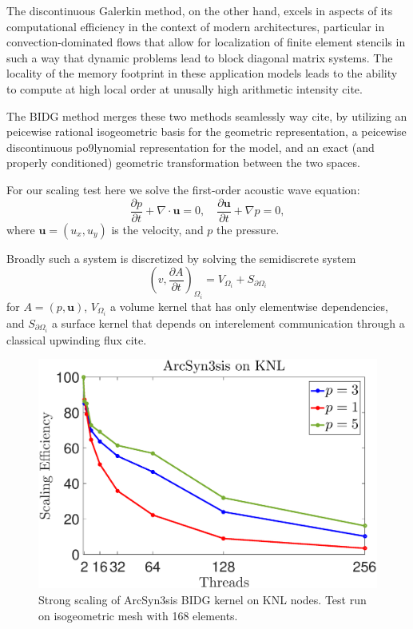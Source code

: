The discontinuous Galerkin method, on the other hand, excels in aspects of its computational efficiency in the context of modern architectures, particular in convection-dominated flows that allow for localization of finite element stencils in such a way that dynamic problems lead to block diagonal matrix systems.  The locality of the memory footprint in these application models leads to the ability to compute at high local order at unusally high arithmetic intensity cite.

The BIDG method merges these two methods seamlessly way cite, by utilizing an peicewise rational isogeometric basis for the geometric representation, a peicewise discontinuous po9lynomial representation for the model, and an exact (and properly conditioned) geometric transformation between the two spaces.

For our scaling test here we solve the first-order acoustic wave equation: \begin{equation} \label{awe} \frac{\partial p}{\partial t} + \nabla\cdot \boldsymbol{u} = 0, \quad  \frac{\partial\boldsymbol{u}}{\partial t} + \nabla p = 0, \end{equation} where $\boldsymbol{u}=(u_x,u_y)$ is the velocity, and $p$ the pressure.

Broadly such a system is discretized by solving the semidiscrete system \[ \left( v, \frac{ \partial A}{\partial t} \right)_{\Omega_{i}}= V_{\Omega_{i}}+S_{\partial\Omega_{i}} \] for $A = (p,\boldsymbol{u})$, $V_{\Omega_{i}}$ a volume kernel that has only elementwise dependencies, and $S_{\partial\Omega_{i}}$ a surface kernel that depends on interelement communication through a classical upwinding flux cite.  


\begin{figure}[h]
\begin{center}
\includegraphics[width=0.95\linewidth]{./bidg_data/scaling_p}
\end{center}
\vspace*{-.5cm}
\caption{Strong scaling of ArcSyn3sis BIDG kernel on KNL nodes.  Test run on isogeometric mesh with 168 elements.}
\label{fig:dns_scaling}
\end{figure}


